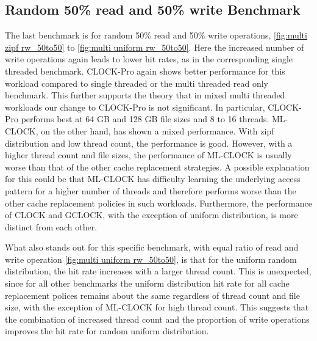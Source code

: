 \documentclass[
	12pt,
	a4paper,
	abstract,
	bibliography=totoc,
	chapterprefix,
	headings=openright,
	numbers=endperiod,
	parskip=half,
	twoside,
]{scrreprt}
\begin{document}
\newpage
\subsection{Random 50\% read and 50\% write Benchmark}

The last benchmark is for random 50\% read and 50\% write operations, \cref{fig:multi zipf rw_50to50} to 
\cref{fig:multi uniform rw_50to50}.
Here the increased number of write operations again leads to lower hit rates, 
as in the corresponding single threaded benchmark.
CLOCK-Pro again shows better  performance for this workload compared to single threaded or 
the multi threaded read only benchmark.
This further supports the theory that in mixed multi threaded workloads our 
change to CLOCK-Pro is not significant.
In particular, CLOCK-Pro performs best at 64 GB and 128 GB 
file sizes and 8 to 16 threads.
ML-CLOCK, on the other hand, has shown a mixed performance.
With zipf distribution and low thread count, the performance is good.
However, with a higher thread count and file sizes, the performance of ML-CLOCK 
is usually worse than that of the other cache replacement strategies.
A possible explanation for this could be that ML-CLOCK has difficulty learning the 
underlying access pattern for a higher number of threads and 
therefore performs worse than the other cache replacement policies in such workloads.
Furthermore, the performance of CLOCK and GCLOCK, with the exception of uniform distribution, 
is more distinct from each other.

What also stands out for this specific benchmark, 
with equal ratio of read and write operation \cref{fig:multi uniform rw_50to50}, 
is that for the uniform random distribution, the hit rate increases with a larger thread count.
This is unexpected, since for all other benchmarks the uniform distribution hit rate for all cache replacement 
polices remains about the same regardless of thread count and file size, 
with the exception of ML-CLOCK for high thread count.
This suggests that the combination of increased thread count and the proportion of write operations 
improves the hit rate for random uniform distribution.
\end{document}
